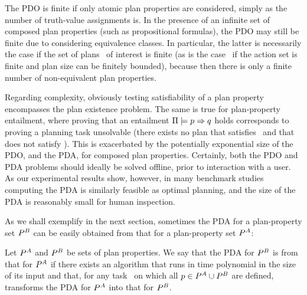 %
%
The PDO is finite if only atomic plan properties are considered,
simply as the number of truth-value assignments is. In the presence of
an infinite set of composed plan properties (such as propositional
formulas), the PDO may still be finite due to considering equivalence
classes. In particular, the latter is necessarily the case if the set
of plans \plans\ of interest is finite (as is the case \eg\ if the
action set is finite and plan size can be finitely bounded), because
then there is only a finite number of non-equivalent plan properties.

Regarding complexity, obviously testing satisfiability of a plan
property encompasses the plan existence problem. The same is true for
plan-property entailment, where proving that an entailment
$\Pi \models p \Rightarrow q$ holds corresponds to proving a
planning task unsolvable (there exists no plan that satisfies
\prop\ and that does not satisfy \propq). This is exacerbated by the
potentially exponential size of the PDO, and the PDA, for composed
plan properties. Certainly, both the PDO and PDA problems should
ideally be solved offline, prior to interaction with a user. As our
experimental results show, however, in many benchmark studies
computing the PDA is similarly feasible as optimal planning, and the
size of the PDA is reasonably small for human inspection.





As we shall exemplify in the next section, sometimes the PDA for a
plan-property set $P^B$ can be easily obtained from that for a
plan-property set $P^A$:

\begin{definition}
Let $P^A$ and $P^B$ be sets of plan properties. We say that
the PDA for $P^B$ is  from that
for $P^A$ if there exists an algorithm that runs in time
polynomial in the size of its input and that, for any task \task\ on
which all $p \in P^A \cup P^B$ are defined, transforms
the PDA for $P^A$ into that for $P^B$.
\end{definition}




